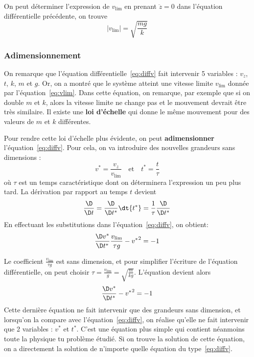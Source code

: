 \documentclass{cours}
\begin{document}
On peut déterminer l'expression de $v_\text{lim}$ en prenant $\ddot{z}=0$ dans l'équation différentielle précédente, on trouve
\begin{equation}
\left|v_\text{lim}\right| = \sqrt{\frac{mg}{k}}
\label{eq:vlim}
\end{equation}

\subsubsection{Adimensionnement}%
\label{ssub:Adimensionnement}

On remarque que l'équation différentielle~\eqref{eq:diffv} fait intervenir 5 variables : $v_z$, $t$, $k$, $m$ et $g$. Or, on a montré que le système atteint une vitesse limite $v_\text{lim}$ donnée par l'équation~\eqref{eq:vlim}. Dans cette équation, on remarque, par exemple que si on double $m$ et $k$, alors la vitesse limite ne change pas et le mouvement devrait être très similaire. Il existe une \textbf{loi d'échelle} qui donne le même mouvement pour des valeurs de $m$ et $k$ différentes.

Pour rendre cette loi d'échelle plus évidente, on peut \textbf{adimensionner} l'équation~\ref{eq:diffv}. Pour cela, on va introduire des nouvelles grandeurs sans dimensions :
\begin{equation}
  v^* = \frac{v_z}{v_\text{lim}} \quad \text{et} \quad t^* = \frac{t}{\tau}
\end{equation}
où $\tau$ est un temps caractéristique dont on déterminera l'expression un peu plus tard.
La dérivation par rapport au temps $t$ devient
\begin{equation}
  \frac{\D}{\D t} = \frac{\D}{\D t^*}\dt{t^*} = \frac{1}{\tau}\frac{\D}{\D t^*}
\end{equation}
En effectuant les substitutions dans l'équation~\ref{eq:diffv}, on obtient:
\begin{equation}
  \frac{\D v^*}{\D t^*} \frac{v_\text{lim}}{\tau g} - {v^*}^2 = -1
\end{equation}

Le coefficient $\frac{v_\text{lim}}{\tau g}$ est sans dimension, et pour simplifier l'écriture de l'équation différentielle, on peut choisir $\tau=\frac{v_\text{lim}}{g}=\sqrt{\frac{m}{kg}}$. L'équation devient alors
\begin{equation}
  \frac{\D v^*}{\D t^*} - {v^*}^2 = -1
  \label{eq:diff_ad}
\end{equation}
Cette dernière équation ne fait intervenir que des grandeurs sans dimension, et lorsqu'on la compare avec l'équation~\eqref{eq:diffv}, on réalise qu'elle ne fait intervenir que 2 variables : $v^*$ et $t^*$. C'est une équation plus simple qui contient néanmoins toute la physique tu problème étudié. Si on trouve la solution de cette équation, on a directement la solution de n'importe quelle équation du type~\eqref{eq:diffv}. 
\end{document}
